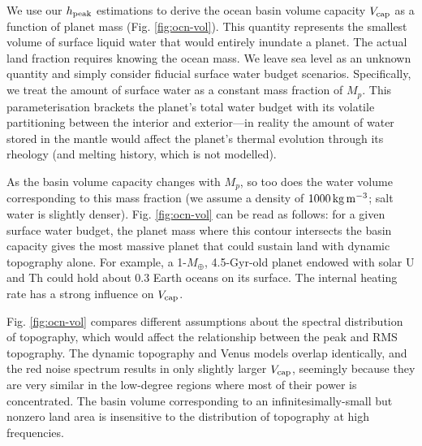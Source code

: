 We use our $h_{\rm peak}$ estimations to derive the ocean basin volume capacity $V_{\rm cap}$ as a function of planet mass (Fig. \ref{fig:ocn-vol}). This quantity represents the smallest volume of surface liquid water that would entirely inundate a planet. The actual land fraction requires knowing the ocean mass. We leave sea level as an unknown quantity and simply consider fiducial surface water budget scenarios. Specifically, we treat the amount of surface water as a constant mass fraction of $M_p$. This parameterisation brackets the planet's total water budget with its volatile partitioning between the interior and exterior---in reality the amount of water stored in the mantle would affect the planet's thermal evolution through its rheology (and melting history, which is not modelled). 

As the basin volume capacity changes with $M_p$, so too does the water volume corresponding to this mass fraction (we assume a density of $1000\,\rm{kg\,m^{-3}}$; salt water is slightly denser). Fig. \ref{fig:ocn-vol} can be read as follows: for a given surface water budget, the planet mass where this contour intersects the basin capacity gives the most massive planet that could sustain land with dynamic topography alone. For example, a 1-$M_\oplus$, 4.5-Gyr-old planet endowed with solar U and Th could hold about 0.3 Earth oceans on its surface. The internal heating rate has a strong influence on $V_{\rm cap}$.


Fig. \ref{fig:ocn-vol} compares different assumptions about the spectral distribution of topography, which would affect the relationship between the peak and RMS topography. The dynamic topography and Venus models overlap identically, and the red noise spectrum results in only slightly larger $V_{\rm cap}$, seemingly because they are very similar in the low-degree regions where most of their power is concentrated. The basin volume corresponding to an infinitesimally-small but nonzero land area is insensitive to the distribution of topography at high frequencies.











